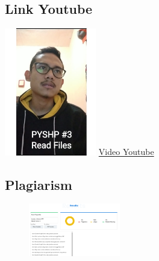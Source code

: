 \subsection{Link Youtube}
\includegraphics[width=4cm]{figures/1174021/3/fahmi3.PNG}
\href{https://youtu.be/9gqdt2JEr_E}{Video Youtube}

\subsection{Plagiarism}
\begin{figure}[H]
	\includegraphics[width=4cm]{figures/1174021/3/buktiplagi1.PNG}
\end{figure}
